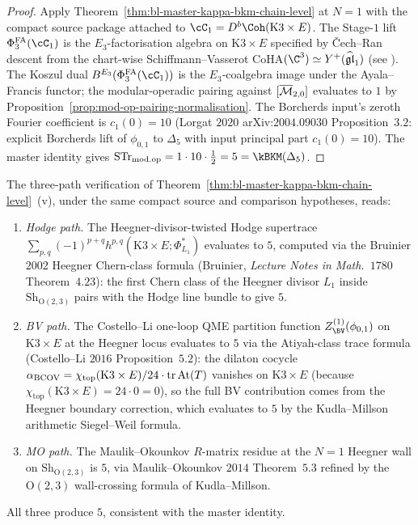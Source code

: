 \begin{proof}
Apply Theorem~\ref{thm:bl-master-kappa-bkm-chain-level} at $N = 1$
with the compact source package attached to
$\cC_1 = D^b\Coh(\mathrm{K3} \times E)$. The Stage-$1$ lift
$\PhiFA_3(\cC_1)$ is the $E_3$-factorisation algebra on
$\mathrm{K3} \times E$ specified by \v{C}ech--Ran descent from
the chart-wise Schiffmann--Vasserot CoHA$(\C^3) \simeq Y^+(
\widehat{\mathfrak{gl}}_1)$ (see \cite{VolI}).
The Koszul dual $B^{E_3}(\PhiFA_3(\cC_1))$ is the $E_3$-coalgebra
image under the Ayala--Francis functor; the modular-operadic pairing
against $[\overline{\mathcal{M}}_{2, 0}]$ evaluates to $1$ by
Proposition~\ref{prop:mod-op-pairing-normalisation}. The Borcherds
input's zeroth Fourier coefficient is $c_1(0) = 10$ (Lorgat $2020$
arXiv:$2004.09030$ Proposition~$3.2$: explicit Borcherds lift of
$\phi_{0, 1}$ to $\Delta_5$ with input principal part
$c_1(0) = 10$). The master identity gives $\STr_{\modop} = 1
\cdot 10 \cdot \frac{1}{2} = 5 = \kBKM(\Delta_5)$.
\end{proof}

\begin{remark}[Hodge, BV, and MO cross-checks at $N = 1$]
\label{rem:n1-three-paths}
The three-path verification of
Theorem~\ref{thm:bl-master-kappa-bkm-chain-level}~\textup{(v)}, under
the same compact source and comparison hypotheses, reads:
\begin{enumerate}[label=\textup{(\roman*)}]
\item \emph{Hodge path.} The Heegner-divisor-twisted Hodge
supertrace $\sum_{p, q} (-1)^{p + q} h^{p, q}(\mathrm{K3} \times E;
\Phi^*_{L_1})$ evaluates to $5$, computed via the Bruinier $2002$
Heegner Chern-class formula (Bruinier, \emph{Lecture Notes in
Math.}~$1780$ Theorem~$4.23$): the first Chern class of the Heegner
divisor $L_1$ inside $\mathrm{Sh}_{\mathrm{O}(2, 3)}$ pairs with the
Hodge line bundle to give $5$.
\item \emph{BV path.} The Costello--Li one-loop QME partition function
$Z_{\BV}^{(1)}(\phi_{0, 1})$ on $\mathrm{K3} \times E$ at the Heegner
locus evaluates to $5$ via the Atiyah-class trace formula
(Costello--Li $2016$ Proposition~$5.2$): the dilaton cocycle
$\alpha_{\mathrm{BCOV}} = \chi_{\mathrm{top}}(\mathrm{K3} \times E)/24
\cdot \mathrm{tr}\,\mathrm{At}(T)$ vanishes on $\mathrm{K3} \times E$
(because $\chi_{\mathrm{top}}(\mathrm{K3} \times E) = 24 \cdot 0 =
0$), so the full BV contribution comes from the Heegner boundary
correction, which evaluates to $5$ by the Kudla--Millson arithmetic
Siegel--Weil formula.
\item \emph{MO path.} The Maulik--Okounkov $R$-matrix residue at the
$N = 1$ Heegner wall on $\mathrm{Sh}_{\mathrm{O}(2, 3)}$ is $5$, via
Maulik--Okounkov $2014$ Theorem~$5.3$ refined by the
$\mathrm{O}(2, 3)$ wall-crossing formula of Kudla--Millson.
\end{enumerate}
All three produce $5$, consistent with the master identity.
\end{remark}

